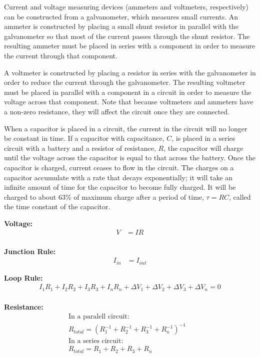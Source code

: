 \begin{chapterSummary}
Current and voltage measuring devices (ammeters and voltmeters, respectively) can be constructed from a galvanometer, which measures small currents. An ammeter is constructed by placing a small shunt resistor in parallel with the galvanometer so that most of the current passes through the shunt resistor. The resulting ammeter must be placed in series with a component in order to measure the current through that component.

A voltmeter is constructed by placing a resistor in series with the galvanometer in order to reduce the current through the galvanometer. The resulting voltmeter must be placed in parallel with a component in a circuit in order to measure the voltage across that component. Note that because voltmeters and ammeters have a non-zero resistance, they will affect the circuit once they are connected.

When a capacitor is placed in a circuit, the current in the circuit will no longer be constant in time. If a capacitor with capacitance, $C$, is placed in a series circuit with a battery and a resistor of resistance, $R$, the capacitor will charge until the voltage across the capacitor is equal to that across the battery. Once the capacitor is charged, current ceases to flow in the circuit. The charges on a capacitor accumulate with a rate that decays exponentially; it will take an infinite amount of time for the capacitor to become fully charged. It will be charged to about 63\% of maximum charge after a period of time, $\tau=RC$, called the time constant of the capacitor.

\end{chapterSummary}

\newpage
\begin{importantEquations}
\medskip
\begin{multicols}{2}
\textbf{Voltage:}
\begin{align*}
V &= IR\\
\end{align*}

\textbf{Junction Rule:}
\begin{align*}
I_{in} &= I_{out}
\end{align*}

\textbf{Loop Rule:}
\begin{align*}
I_1R_1+I_2R_2+I_3R_3+I_nR_n+\Delta V_1+\Delta V_2+\Delta V_3+\Delta V_n = 0
\end{align*}
\columnbreak
\\
\textbf{Resistance:}
\begin{align*}
\text{In a paralell circuit:}&\\
R_{total} = (R_1^{-1}+R_2^{-1}+R_3^{-1}+R_n^{-1})^{-1}\\
\text{In a series circuit:}&\\
R_{total} = R_1+R_2+R_3+R_n\\
\end{align*}
\end{multicols}
\end{importantEquations}

